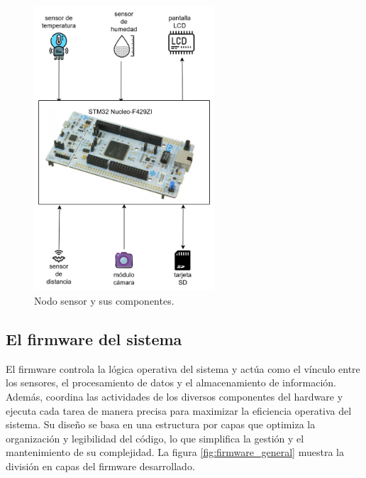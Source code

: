 \vspace{1cm}

\begin{figure}[htbp]
	\centering
	\includegraphics[width=0.6\textwidth, height=0.39\textheight]{./Figures/nodo_sensor.png}
	\caption{Nodo sensor y sus componentes.}
	\label{fig:nodo_sensor}
\end{figure}

\vspace{1cm}

\newpage

\subsection{El firmware del sistema}

El firmware controla la lógica operativa del sistema y actúa como el vínculo entre los sensores, el procesamiento de datos y el almacenamiento de información. Además, coordina las actividades de los diversos componentes del hardware y ejecuta cada tarea de manera precisa para maximizar la eficiencia operativa del sistema. Su diseño se basa en una estructura por capas que optimiza la organización y legibilidad del código, lo que simplifica la gestión y el mantenimiento de su complejidad. La figura \ref{fig:firmware_general} muestra la división en capas del firmware desarrollado.

\newpage

